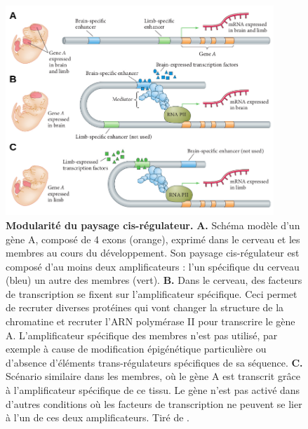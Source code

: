 \begin{figure}[h]
 \centering
 \includegraphics[width=0.9\textwidth, page=1] {figures/introduction/fig23.png}
 \caption[Modularité du paysage \gls{cis}-régulateur.]{
 \textbf{Modularité du paysage \gls{cis}-régulateur.}
 \textbf{A.} Schéma modèle d'un gène A, composé de 4 exons (orange), exprimé dans le cerveau et les membres au cours du développement. Son paysage \gls{cis}-régulateur est composé d'au moins deux \glspl{amplificateur} : l'un spécifique du cerveau (bleu) un autre des membres (vert). 
 \textbf{B.} Dans le cerveau, des facteurs de transcription se fixent sur l'\gls{amplificateur} spécifique. Ceci permet de recruter diverses protéines qui vont changer la structure de la chromatine et recruter l'\acrshort{ARN} polymérase II pour transcrire le gène A. L'\gls{amplificateur} spécifique des membres n'est pas utilisé, par exemple à cause de modification épigénétique particulière ou d'absence d'éléments \gls{trans}-régulateurs spécifiques de sa séquence.
 \textbf{C.} Scénario similaire dans les membres, où le gène A est transcrit grâce à l'\gls{amplificateur} spécifique de ce tissu. Le gène n'est pas activé dans d'autres \glspl{condition} où les facteurs de transcription ne peuvent se lier à l'un de ces deux \glspl{amplificateur}.
 Tiré de \citet{gilbert_developmental_2017}.
 }
 \label{fig:Fig23}
\end{figure}


